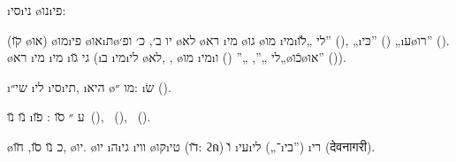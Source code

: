 \begin{framed}
\i{סי}\i{ני} \o{נו}\i{פי}:
\begin{compactitem}
\item {} (\u{קו}  \o{או}) \o{מו}\i{פי} \o{או}\i{ת}\o{יו} ב׳, כ׳ ופ׳  \o{לא} \o{רא} \i{מי} \o{גו} \o{מו} \i{מי}\i{לי} „\u{לו}” (), „\i{כּי}” () „\i{ע}\o{רו}” (). \o{רא} \i{מי}  \i{מי} \i{גי} \u{גו} (\i{ב} \i{מי}\i{לי} \o{לא},    , \o{מו} \i{מי}\i{לי} „”, „” () ו„\o{כֿו}\o{או}” ()).
	\item \i{שי}״ \i{לי} \i{סי}\i{תי}, \i{היא}  \o{מו} ״: \i{שׂ} ().
	\item {}\u{נו}  \u{נו} \i{ע} ״ \u{סו} : \u{פו}{\gnuvah}~(), ~(), ~().
	\item \o{כ} \u{נו} \u{סו}, \u{חו},  \o{יו}. \o{יו}  \i{ה}\i{גי} \i{ווי}  \o{קו}\i{טי} (\u{דו}: {ϩⲛ̄}) \u{ו} \i{עי}\i{לי} („־\i{בי}”)  \i{רי} ({देवनागरी}).
\end{compactitem}

\end{framed}

	
